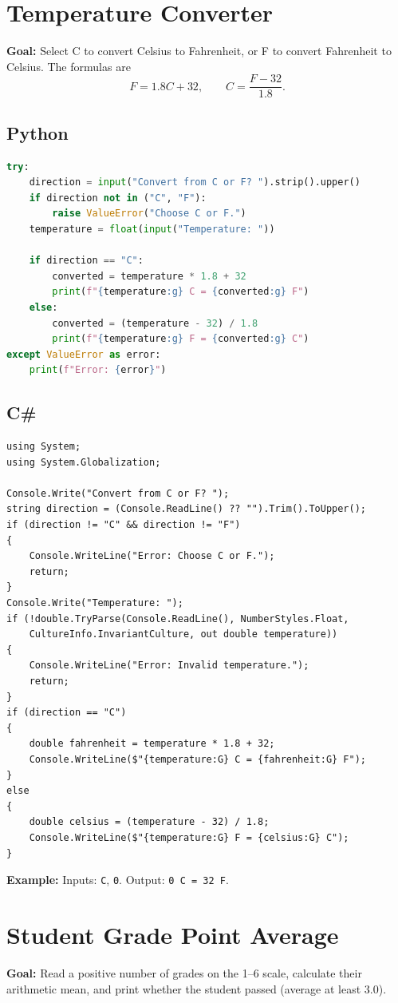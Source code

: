 \documentclass[11pt,a4paper]{article}
\begin{document}
\section{Temperature Converter}
\textbf{Goal:} Select C to convert Celsius to Fahrenheit, or F to convert Fahrenheit to Celsius. The formulas are
\[F = 1.8C + 32, \qquad C = \frac{F-32}{1.8}.\]
\subsection*{Python}
\begin{lstlisting}[language=Python]
try:
    direction = input("Convert from C or F? ").strip().upper()
    if direction not in ("C", "F"):
        raise ValueError("Choose C or F.")
    temperature = float(input("Temperature: "))

    if direction == "C":
        converted = temperature * 1.8 + 32
        print(f"{temperature:g} C = {converted:g} F")
    else:
        converted = (temperature - 32) / 1.8
        print(f"{temperature:g} F = {converted:g} C")
except ValueError as error:
    print(f"Error: {error}")
\end{lstlisting}
\subsection*{C\#}
\begin{lstlisting}
using System;
using System.Globalization;

Console.Write("Convert from C or F? ");
string direction = (Console.ReadLine() ?? "").Trim().ToUpper();
if (direction != "C" && direction != "F")
{
    Console.WriteLine("Error: Choose C or F.");
    return;
}
Console.Write("Temperature: ");
if (!double.TryParse(Console.ReadLine(), NumberStyles.Float,
    CultureInfo.InvariantCulture, out double temperature))
{
    Console.WriteLine("Error: Invalid temperature.");
    return;
}
if (direction == "C")
{
    double fahrenheit = temperature * 1.8 + 32;
    Console.WriteLine($"{temperature:G} C = {fahrenheit:G} F");
}
else
{
    double celsius = (temperature - 32) / 1.8;
    Console.WriteLine($"{temperature:G} F = {celsius:G} C");
}
\end{lstlisting}
\textbf{Example:} Inputs: \texttt{C}, \texttt{0}. Output: \texttt{0 C = 32 F}.
\section{Student Grade Point Average}
\textbf{Goal:} Read a positive number of grades on the 1--6 scale, calculate their arithmetic mean, and print whether the student passed (average at least 3.0).
\end{document}
